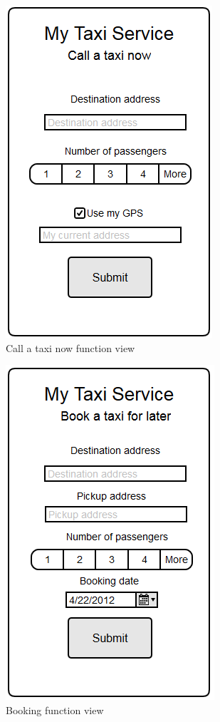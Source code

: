 \begin{figure}
\centering
\includegraphics{tex-images/ui-passenger-call-taxi-now}
\caption{Call a taxi now function view}
\end{figure}

\begin{figure}
\centering
\includegraphics{tex-images/ui-passenger-book}
\caption{Booking function view}
\end{figure}

